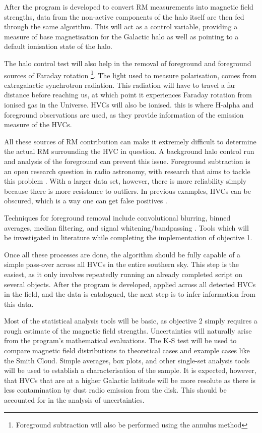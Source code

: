 After the program is developed to convert RM measurements into magnetic field strengths, data from the non-active components of the halo itself are then fed through the same algorithm. This will act as a control variable, providing a measure of base magnetisation for the Galactic halo as well as pointing to a default ionisation state of the halo.

The halo control test will also help in the removal of foreground and foreground sources of Faraday rotation \footnote{Foreground subtraction will also be performed using the annulus method}. The light used to measure polarisation, comes from extragalactic synchrotron radiation. This radiation will have to travel a far distance before reaching us, at which point it experiences Faraday rotation from ionised gas in the Universe. HVCs will also be ionised. this is where H-alpha and foreground observations are used, as they provide information of the emission measure of the HVCs.

All these sources of RM contribution can make it extremely difficult to determine the actual RM surrounding the HVC in question. A background halo control run and analysis of the foreground can prevent this issue. Foreground subtraction is an open research question in radio astronomy, with research that aims to tackle this problem \cite{ID21}. With a larger data set, however, there is more reliability simply because there is more resistance to outliers. In previous examples, HVCs can be obscured, which is a way one can get false positives \cite{ID2, ID36}.

Techniques for foreground removal include convolutional blurring, binned averages, median filtering, and signal whitening/bandpassing \cite{ID38, ID39, ID40}. Tools which will be investigated in literature while completing the implementation of objective 1.

Once all these processes are done, the algorithm should be fully capable of a simple pass-over across all HVCs in the entire southern sky. This step is the easiest, as it only involves repeatedly running an already completed script on several objects. After the program is developed, applied across all detected HVCs in the field, and the data is catalogued, the next step is to infer information from this data.

Most of the statistical analysis tools will be basic, as objective 2 simply requires a rough estimate of the magnetic field strengths. Uncertainties will naturally arise from the program's mathematical evaluations. The K-S test will be used to compare magnetic field distributions to theoretical cases and example cases like the Smith Cloud. Simple averages, box plots, and other single-set analysis tools will be used to establish a characterisation of the sample. It is expected, however, that HVCs that are at a higher Galactic latitude will be more resolute as there is less contamination by dust radio emission from the disk. This should be accounted for in the analysis of uncertainties.

